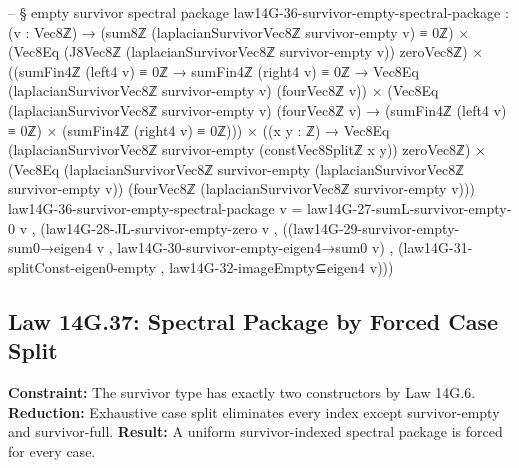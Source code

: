 \documentclass[11pt,a4paper]{book}
\def\texttt#1{#1}%
\begin{document}
\begin{code}
-- § empty survivor spectral package
law14G-36-survivor-empty-spectral-package : (v : Vec8ℤ) →
  (sum8ℤ (laplacianSurvivorVec8ℤ survivor-empty v) ≡ 0ℤ) ×
  (Vec8Eq (J8Vec8ℤ (laplacianSurvivorVec8ℤ survivor-empty v)) zeroVec8ℤ) ×
  ((sumFin4ℤ (left4 v) ≡ 0ℤ → sumFin4ℤ (right4 v) ≡ 0ℤ → Vec8Eq (laplacianSurvivorVec8ℤ survivor-empty v) (fourVec8ℤ v)) ×
   (Vec8Eq (laplacianSurvivorVec8ℤ survivor-empty v) (fourVec8ℤ v) → (sumFin4ℤ (left4 v) ≡ 0ℤ) × (sumFin4ℤ (right4 v) ≡ 0ℤ))) ×
  ((x y : ℤ) → Vec8Eq (laplacianSurvivorVec8ℤ survivor-empty (constVec8Splitℤ x y)) zeroVec8ℤ) ×
  (Vec8Eq (laplacianSurvivorVec8ℤ survivor-empty (laplacianSurvivorVec8ℤ survivor-empty v))
         (fourVec8ℤ (laplacianSurvivorVec8ℤ survivor-empty v)))
law14G-36-survivor-empty-spectral-package v =
  law14G-27-sumL-survivor-empty-0 v ,
  (law14G-28-JL-survivor-empty-zero v ,
   ((law14G-29-survivor-empty-sum0→eigen4 v , law14G-30-survivor-empty-eigen4→sum0 v) ,
    (law14G-31-splitConst-eigen0-empty ,
     law14G-32-imageEmpty⊆eigen4 v)))
\end{code}

\subsection{Law 14G.37: Spectral Package by Forced Case Split}

\textbf{Constraint:} The survivor type has exactly two constructors by Law 14G.6.
\textbf{Reduction:} Exhaustive case split eliminates every index except \texttt{survivor-empty} and \texttt{survivor-full}.
\textbf{Result:} A uniform survivor-indexed spectral package is forced for every case.
\end{document}
